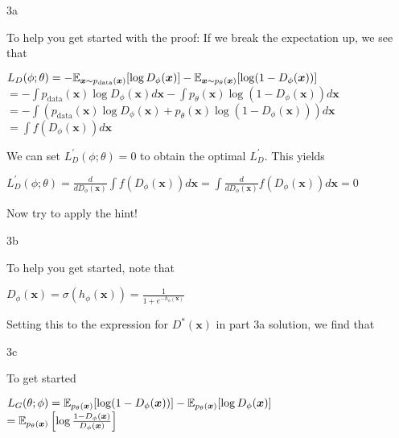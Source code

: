 \LARGE
3a
\normalsize
\begin{answer}
    To help you get started with the proof:
    If we break the expectation up, we see that

    \begin{center}
        $L_{D}(\phi; \theta) = - \mathbb{E}_{\bm{x} \sim p_{\text{data}}(\bm{x})}[\log D_{\phi}(\bm{x})] - \mathbb{E}_{\bm{x} \sim p_{\theta}(\bm{x})}[\log(1-D_{\phi}(\bm{x}))]$ \\ 
        $ = - \int p_{\text{data}}(\bm{x}) \log D_{\phi}(\bm{x})d\bm{x} - \int p_{\theta}(\bm{x}) \log(1-D_{\phi}(\bm{x}))d\bm{x}$ \\
        $ = - \int \left(p_{\text{data}}(\bm{x}) \log D_{\phi}(\bm{x}) + p_{\theta}(\bm{x}) \log(1-D_{\phi}(\bm{x})) \right)d\bm{x}$ \\
        $ = \int f(D_{\phi}(\bm{x}))d\bm{x}$
    \end{center}

    We can set $L^{\prime}_D(\phi; \theta) = 0$ to obtain the optimal $L^{\prime}_D$. This yields 
    
    \begin{center}
        $L^{\prime}_D(\phi;\theta) = \frac{d}{d D_{\phi}(\bm{x})} \int f(D_{\phi}(\bm{x}))d\bm{x} = \int \frac{d}{d D_{\phi}(\bm{x})} f(D_{\phi}(\bm{x}))d\bm{x} = 0$
    \end{center}
    
    Now try to apply the hint!
\end{answer}

\LARGE
3b
\normalsize
\begin{answer}
    To help you get started, note that

    \begin{center}
        $D_{\phi}(\bm{x}) = \sigma(h_{\phi}(\bm{x})) = \frac{1}{1 + e^{-h_{\phi}(\bm{x})}}$
    \end{center}

    Setting this to the expression for $D^{*}(\bm{x})$ in part 3a solution, we find that

\end{answer}

\LARGE
3c
\normalsize
\begin{answer}
    To get started
    \begin{center}
        $L_{G}(\theta; \phi) = \mathbb{E}_{p_{\theta}(\bm{x})}[\log (1-D_{\phi}(\bm{x}))] - \mathbb{E}_{p_{\theta}(\bm{x})}[\log D_{\phi}(\bm{x})]$ \\
        $ = \mathbb{E}_{p_{\theta}(\bm{x})} \left[\log \frac{1-D_{\phi}(\bm{x})}{D_{\phi}(\bm{x})}\right]$ \\
    \end{center}

\end{answer}

